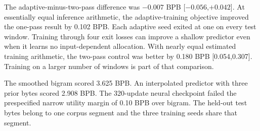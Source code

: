 The adaptive-minus-two-pass difference was $-0.007$ BPB [$-0.056$,$+0.042$]. At essentially equal inference arithmetic, the adaptive-training objective improved the one-pass result by 0.102 BPB. Each adaptive seed exited at one on every test window. Training through four exit losses can improve a shallow predictor even when it learns no input-dependent allocation. With nearly equal estimated training arithmetic, the two-pass control was better by 0.180 BPB [0.054,0.307]. Training on a larger number of windows is part of that comparison.

The smoothed bigram scored 3.625 BPB. An interpolated predictor with three prior bytes scored 2.908 BPB. The 320-update neural checkpoint failed the prespecified narrow utility margin of 0.10 BPB over bigram. The held-out test bytes belong to one corpus segment and the three training seeds share that segment.
